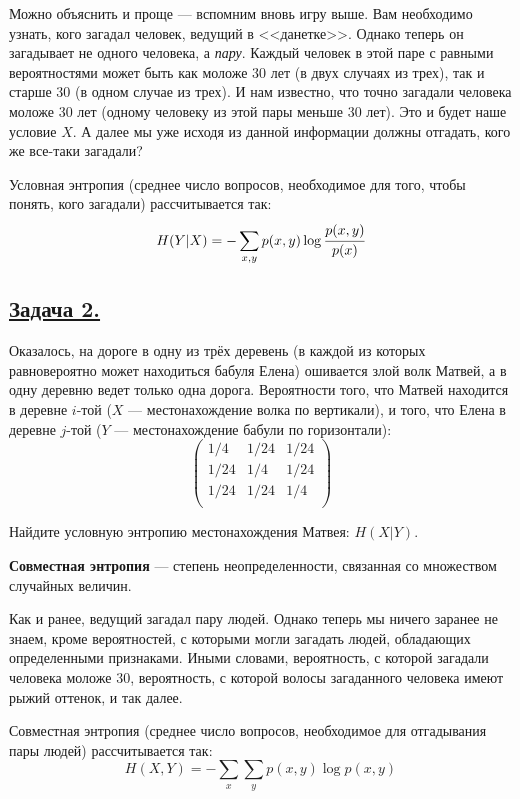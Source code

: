 Можно объяснить и проще --- вспомним вновь игру выше. Вам необходимо узнать, кого загадал человек, ведущий в <<данетке>>. Однако теперь он загадывает не одного человека, а \textit{пару}. Каждый человек в этой паре с равными вероятностями может быть как моложе 30 лет (в двух случаях из трех), так и старше 30 (в одном случае из трех). И нам известно, что точно загадали человека моложе 30 лет (одному человеку из этой пары меньше 30 лет). Это и будет наше условие $X$. А далее мы уже исходя из данной информации должны отгадать, кого же все-таки загадали?

Условная энтропия (среднее число вопросов, необходимое для того, чтобы понять, кого загадали) рассчитывается так:
\[H(Y|X)=-\sum\limits_{x, y} p(x, y)\log \cfrac{p(x, y)}{p(x)} \]

\subsection*{\hyperref[sec:sol_problem2]{Задача 2.}}\label{sec:problem2} Оказалось, на дороге в одну из трёх деревень (в каждой из которых равновероятно может находиться бабуля Елена) ошивается злой волк Матвей, а в одну деревню ведет только одна дорога. Вероятности того, что Матвей находится в деревне $i$-той ($X$ --- местонахождение волка по вертикали), и того, что Елена в деревне $j$-той ($Y$ --- местонахождение бабули по горизонтали):
\[\begin{pmatrix}
    1/4 & 1/24 & 1/24 \\
    1/24 & 1/4 & 1/24 \\
    1/24 & 1/24 & 1/4 \\
\end{pmatrix} \]

Найдите условную энтропию местонахождения Матвея: $H(X|Y)$. 
\\

\begin{siderules}
    \textbf{Совместная энтропия} --- степень неопределенности, связанная со множеством случайных величин.
\end{siderules}

Как и ранее, ведущий загадал пару людей. Однако теперь мы ничего заранее не знаем, кроме вероятностей, с которыми могли загадать людей, обладающих определенными признаками. Иными словами, вероятность, с которой загадали человека моложе 30, вероятность, с которой волосы загаданного человека имеют рыжий оттенок, и так далее.

Совместная энтропия (среднее число вопросов, необходимое для отгадывания пары людей) рассчитывается так:
\[H(X, Y)=-\sum\limits_{x}\sum\limits_{y} p(x, y)\log p(x ,y) \]

